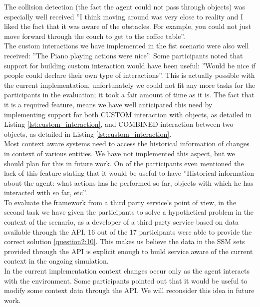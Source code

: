 The collision detection (the fact the agent could not pass through objects) was especially well received ''I think moving around was very close to reality and I liked the fact that it was aware of the obstacles. For example, you could not just move forward through the couch to get to the coffee table''.\\

The custom interactions we have implemented in the fist scenario were also well received: ''The Piano playing actions were nice''. Some participants noted that support for building custom interaction would have been useful: ''Would be nice if people could declare their own type of interactions''. This is actually possible with the current implementation, unfortunately we could not fit any more tasks for the participants in the evaluation; it took a fair amount of time as it is. The fact that it is a required feature, means we have well anticipated this need by implementing support for both CUSTOM interaction with objects, as detailed in Listing \ref{lst:custom_interaction}, and COMBINED interaction between two objects, as detailed in Listing \ref{lst:custom_interaction}.\\

Most context aware systems need to access the historical information of changes in context of various entities. We have not implemented this aspect, but we should plan for this in future work. On of the participants even mentioned the lack of this feature stating that it would be useful to have ''Historical information about the agent: what actions has he performed so far, objects with which he has interacted with so far, etc''.\\

To evaluate the framework from a third party service's point of view, in the second task we have given the participants to solve a hypothetical problem in the context of the scenario, as a developer of a third party service based on data available through the API. 16 out of the 17 participants were able to provide the correct solution \ref{question2:10}. This makes us believe the data in the SSM sets provided through the API is explicit enough to build service aware of the current context in the ongoing simulation.\\

In the current implementation context changes occur only as the agent interacts with the environment. Some participants pointed out that it would be useful to modify some context data through the API. We will reconsider this idea in future work.\\

